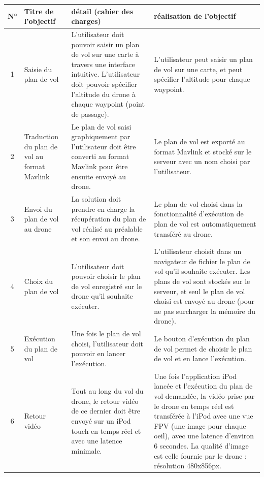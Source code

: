 \documentclass{article}
\begin{document}
\begin{center}
	    \vspace*{0.7cm}
        \begin{tabularx}{15cm}{|c|p{3cm}|p{5cm}||X|}
            \hline
            N° & Titre de l'objectif & détail (cahier des charges) & réalisation de l'objectif\\
            \hline
            1 & Saisie du plan de vol & L'utilisateur doit pouvoir saisir un plan de vol sur une carte à travers une interface intuitive. L'utilisateur doit pouvoir spécifier l'altitude du drone à chaque waypoint (point de passage).& L'utilisateur peut saisir un plan de vol sur une carte, et peut spécifier l'altitude pour chaque waypoint.\\
            \hline
            2 & Traduction du plan de vol au format Mavlink & Le plan de vol saisi graphiquement par l'utilisateur doit être converti au format Mavlink pour être ensuite envoyé au drone.& Le plan de vol est exporté au format Mavlink et stocké sur le serveur avec un nom choisi par l'utilisateur.\\
            \hline
            3 & Envoi du plan de vol au drone & La solution doit prendre en charge la récupération du plan de vol réalisé au préalable et son envoi au drone. & Le plan de vol choisi dans la fonctionnalité d'exécution de plan de vol est automatiquement transféré au drone.\\
            \hline
            4 & Choix du plan de vol  & L'utilisateur doit pouvoir choisir le plan de vol enregistré sur le drone qu'il souhaite exécuter. & L'utilisateur choisit dans un navigateur de fichier le plan de vol qu'il souhaite exécuter. Les plans de vol sont stockés sur le serveur, et seul le plan de vol choisi est envoyé au drone (pour ne pas surcharger la mémoire du drone). \\
            \hline
            5 & Exécution du plan de vol  & Une fois le plan de vol choisi, l'utilisateur doit pouvoir en lancer l'exécution. & Le bouton d'exécution du plan de vol permet de choisir le plan de vol et en lance l'exécution.\\
            \hline
            6 & Retour vidéo  & Tout au long du vol du drone, le retour vidéo de ce dernier doit être envoyé sur un iPod touch en temps réel et avec une latence minimale. & Une fois l'application iPod lancée et l'exécution du plan de vol demandée, la vidéo prise par le drone en temps réel est transférée à l'iPod avec une vue FPV (une image pour chaque oeil), avec une latence d'environ 6 secondes. La qualité d'image est celle fournie par le drone : résolution 480x856px. \\

\end{tabularx}
\end{center}
\end{document}

